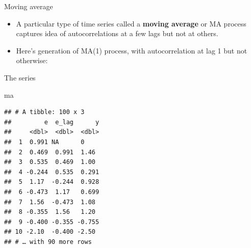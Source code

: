 \documentclass[ignorenonframetext,]{beamer}
\newenvironment{Shaded}{\begin{snugshade}}{\end{snugshade}}
\newcommand{\DataTypeTok}[1]{\textcolor[rgb]{0.13,0.29,0.53}{#1}}
\newcommand{\DecValTok}[1]{\textcolor[rgb]{0.00,0.00,0.81}{#1}}
\newcommand{\KeywordTok}[1]{\textcolor[rgb]{0.13,0.29,0.53}{\textbf{#1}}}
\newcommand{\NormalTok}[1]{#1}
\newcommand{\OperatorTok}[1]{\textcolor[rgb]{0.81,0.36,0.00}{\textbf{#1}}}
\newcommand{\StringTok}[1]{\textcolor[rgb]{0.31,0.60,0.02}{#1}}
\begin{document}
\begin{frame}[fragile]{Moving average}
\protect\hypertarget{moving-average}{}

\begin{itemize}
\item
  A particular type of time series called a \textbf{moving average} or
  MA process captures idea of autocorrelations at a few lags but not at
  others.
\item
  Here's generation of MA(1) process, with autocorrelation at lag 1 but
  not otherwise:
\end{itemize}

\begin{Shaded}
\end{Shaded}

\end{frame}

\begin{frame}[fragile]{The series}
\protect\hypertarget{the-series}{}

\small

\begin{Shaded}
\begin{Highlighting}[]
\NormalTok{ma}
\end{Highlighting}
\end{Shaded}

\begin{verbatim}
## # A tibble: 100 x 3
##         e  e_lag      y
##     <dbl>  <dbl>  <dbl>
##  1  0.991 NA      0    
##  2  0.469  0.991  1.46 
##  3  0.535  0.469  1.00 
##  4 -0.244  0.535  0.291
##  5  1.17  -0.244  0.928
##  6 -0.473  1.17   0.699
##  7  1.56  -0.473  1.08 
##  8 -0.355  1.56   1.20 
##  9 -0.400 -0.355 -0.755
## 10 -2.10  -0.400 -2.50 
## # … with 90 more rows
\end{verbatim}

\normalsize

\end{frame}
\end{document}
